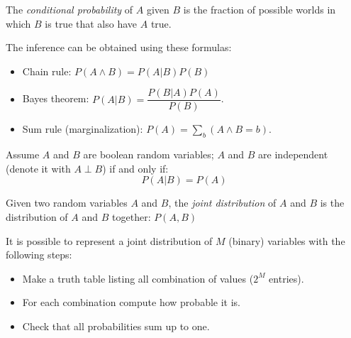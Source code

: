 \documentclass[12pt, a4paper]{report}
\begin{document}
    \begin{definition}
        The \emph{conditional probability} of $A$ given $B$ is the fraction of possible worlds in which $B$ is true that also have $A$ true. 
    \end{definition}
    The inference can be obtained using these formulas: 
    \begin{itemize}
        \item Chain rule: $P(A \land B)=P(A|B)P(B)$
        \item Bayes theorem: $P(A|B)=\dfrac{P(B|A)P(A)}{P(B)}$.
        \item Sum rule (marginalization): $P(A)=\sum_{b}{(A \land B=b)}$.
    \end{itemize}
    \begin{definition}
        Assume $A$ and $B$ are boolean random variables; $A$ and $B$ are independent (denote it with $A \perp B$) if and only if:
        \[P(A|B)=P(A)\]

        Given two random variables $A$ and $B$, the \emph{joint distribution} of $A$ and $B$ is the distribution of $A$ and $B$ together: $P(A,B)$
    \end{definition}
    It is possible to represent a joint distribution of $M$ (binary) variables with the following steps:
    \begin{itemize}
        \item Make a truth table listing all combination of values ($2^M$ entries).
        \item For each combination compute how probable it is. 
        \item Check that all probabilities sum up to one. 
    \end{itemize}
\end{document}
